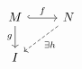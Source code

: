 \documentclass{standalone}
\begin{document}
$\displaystyle  \begin{tikzcd} M \arrow[hookrightarrow]{r}{f} \arrow[swap]{d}{g} & N \arrow[dashed]{ld}{\exists h} \\ I & \end{tikzcd} $
\end{document}
